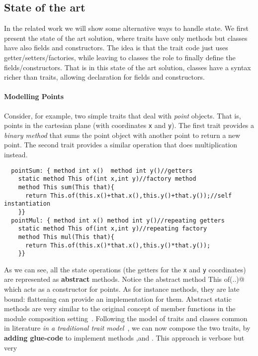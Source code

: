 \subsection{State of the art}
In the related work we will show some alternative ways to handle
state.
We first present the state of the art solution, where 
traits have only methods but classes have also fields and constructors.
The idea is that the trait code just uses getter/setters/factories, while leaving
to classes the role to finally define the fields/constructors. That
is in this state of the art solution, classes have a syntax richer than traits, allowing
declaration for fields and constructors. 

\paragraph{Modelling Points} Consider, for example, two simple 
traits that deal with \emph{point} objects. That is, points
in the cartesian plane (with coordinates \lstinline{x} and
\lstinline{y}). The first trait provides a \emph{binary method} that 
sums the point object with another point to return a new point. 
The second trait provides a similar operation that does multiplication 
instead.
\saveSpace 
\begin{lstlisting}
  pointSum: { method int x()  method int y()//getters
    static method This of(int x,int y)//factory method
    method This sum(This that){
      return This.of(this.x()+that.x(),this.y()+that.y());//self instantiation
    }}
  pointMul: { method int x() method int y()//repeating getters
    static method This of(int x,int y)//repeating factory
    method This mul(This that){
      return This.of(this.x()*that.x(),this.y()*that.y());
    }}
\end{lstlisting}
\saveSpace
\noindent As we can see, all the state operations (the getters for the 
\lstinline{x} and \lstinline{y} coordinates) are represented as {\bf abstract} methods.
Notice the abstract \Q@static method This of(..)@ which acts as a constructor
for points. 
As for instance methods, they are late bound:  flattening can provide an implementation for them.
Abstract static methods are very similar to the original concept of member functions in the module composition setting~\cite{ancona2002calculus}.
Following the model of traits and classes common in literature \emph{in a traditional trait model}~\cite{Traits:ECOOP2003},
we can now compose the two traits, by \textbf{adding glue-code}
to implement methods \Q@x@,\Q@y@ and \Q@of@.
This approach is verbose but very
